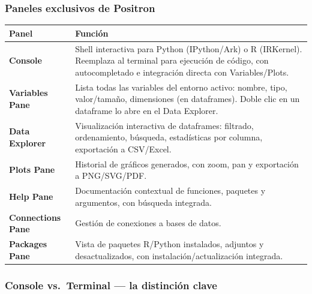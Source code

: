 \documentclass[
  doc,
  floatsintext,
  longtable,
  a4paper,
  nolmodern,
  notxfonts,
  notimes,
  12pt,
  colorlinks=true,linkcolor=blue,citecolor=blue,urlcolor=blue]{apa7}
\newcounter{none} %
\begin{document}
\subsubsection{Paneles exclusivos de
Positron}\label{paneles-exclusivos-de-positron}

{\def\LTcaptype{none} %
\begin{longtable}[]{@{}
  >{\raggedright\arraybackslash}p{}
  >{\raggedright\arraybackslash}p{}@{}}
\toprule\noalign{}
\begin{minipage}[b]{\linewidth}\raggedright
Panel
\end{minipage} & \begin{minipage}[b]{\linewidth}\raggedright
Función
\end{minipage} \\
\midrule\noalign{}
\endhead
\bottomrule\noalign{}
\endlastfoot
\textbf{Console} & Shell interactiva para Python (IPython/Ark) o R
(IRKernel). Reemplaza al terminal para ejecución de código, con
autocompletado e integración directa con Variables/Plots. \\
\textbf{Variables Pane} & Lista todas las variables del entorno activo:
nombre, tipo, valor/tamaño, dimensiones (en dataframes). Doble clic en
un dataframe lo abre en el Data Explorer. \\
\textbf{Data Explorer} & Visualización interactiva de dataframes:
filtrado, ordenamiento, búsqueda, estadísticas por columna, exportación
a CSV/Excel. \\
\textbf{Plots Pane} & Historial de gráficos generados, con zoom, pan y
exportación a PNG/SVG/PDF. \\
\textbf{Help Pane} & Documentación contextual de funciones, paquetes y
argumentos, con búsqueda integrada. \\
\textbf{Connections Pane} & Gestión de conexiones a bases de datos. \\
\textbf{Packages Pane} & Vista de paquetes R/Python instalados, adjuntos
y desactualizados, con instalación/actualización integrada. \\
\end{longtable}
}

\subsubsection{Console vs.~Terminal --- la distinción
clave}\label{console-vs.-terminal-la-distinciuxf3n-clave}
\end{document}
